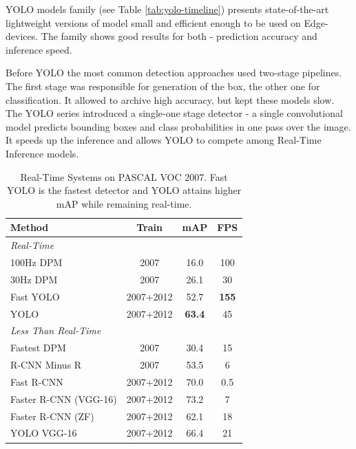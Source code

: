 \documentclass[12pt,a4paper]{report}
\begin{document}
    YOLO models family (see Table \ref{tab:yolo-timeline}) presents state-of-the-art
    lightweight versions of model small and efficient enough to be used
    on Edge-devices. The family shows good results for both - prediction
    accuracy and inference speed.

    Before YOLO \cite{Redmon2016YOLO} the most common detection approaches used
    two-stage pipelines. The first stage was responsible for generation of
    the box, the other one for classification. It allowed to archive high
    accuracy, but kept these models slow. The YOLO series introduced a single-one
    stage detector - a single convolutional model predicts bounding boxes and
    class probabilities in one pass over the image. It speeds up the inference and
    allows YOLO to compete among Real-Time Inference models.


    \begin{table}[t]
    \centering
    \label{tab:yolo2007_realtime}
    \begin{tabular}{lccc}
    \toprule
    \textbf{Method} & \textbf{Train} & \textbf{mAP} & \textbf{FPS} \\
    \midrule
    \multicolumn{4}{l}{\emph{Real-Time}} \\
    \midrule
    100Hz DPM \cite{sadeghi2014dpm} & 2007 & 16.0 & 100 \\
    30Hz DPM \cite{sadeghi2014dpm}  & 2007 & 26.1 & 30 \\
    Fast YOLO                        & 2007+2012 & 52.7 & \textbf{155} \\
    YOLO                             & 2007+2012 & \textbf{63.4} & 45 \\
    \midrule
    \multicolumn{4}{l}{\emph{Less Than Real-Time}} \\
    \midrule
    Fastest DPM \cite{yan2014fastestdpm}                & 2007 & 30.4 & 15 \\
    R-CNN Minus R \cite{lenc2015rcnnminusr}             & 2007 & 53.5 & 6 \\
    Fast R-CNN \cite{girshick2015fast}                  & 2007+2012 & 70.0 & 0.5 \\
    Faster R-CNN (VGG-16) \cite{ren2015faster}          & 2007+2012 & 73.2 & 7 \\
    Faster R-CNN (ZF) \cite{ren2015faster}              & 2007+2012 & 62.1 & 18 \\
    YOLO VGG-16                                         & 2007+2012 & 66.4 & 21 \\
    \bottomrule
    \end{tabular}
    \caption{Real-Time Systems on PASCAL VOC 2007. Fast YOLO is the fastest
    detector and YOLO attains higher mAP while remaining real-time.
    \cite{Redmon2016YOLO}}
    \end{table}
\end{document}
